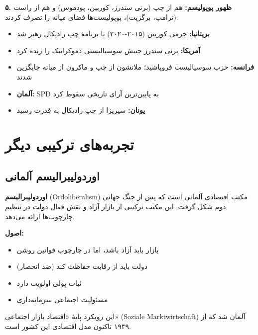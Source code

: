 \textbf{۵. ظهور پوپولیسم:}
هم از چپ (برنی سندرز، کوربین، پودموس) و هم از راست (ترامپ، برگزیت)، پوپولیست‌ها فضای میانه را تصرف کردند.


\begin{tcolorbox}[
    enhanced,
    colback=goldaccent!10,
    colframe=goldaccent,
    boxrule=1.5pt,
    arc=5pt,
    fonttitle=\bfseries,
    title={\rl{🟡 نکتهٔ تاریخی: واکنش‌ها به راه سوم}}
]
\begin{itemize}
    \item \textbf{بریتانیا:} جرمی کوربین (۲۰۱۵-۲۰۲۰) با برنامهٔ چپ رادیکال رهبر شد
    \item \textbf{آمریکا:} برنی سندرز جنبش سوسیالیستی دموکراتیک را زنده کرد
    \item \textbf{فرانسه:} حزب سوسیالیست فروپاشید؛ ملانشون از چپ و ماکرون از میانه جایگزین شدند
    \item \textbf{آلمان:} SPD به پایین‌ترین آرای تاریخی سقوط کرد
    \item \textbf{یونان:} سیریزا از چپ رادیکال به قدرت رسید
\end{itemize}
\end{tcolorbox}

\section{تجربه‌های ترکیبی دیگر}

\subsection{اوردولیبرالیسم آلمانی}

\begin{tcolorbox}[
    enhanced,
    colback=rightblue!8,
    colframe=rightblue,
    boxrule=1.5pt,
    arc=5pt,
    fonttitle=\bfseries,
    title={\rl{🔵 مفهوم کلیدی: اوردولیبرالیسم}}
]
\textbf{اوردولیبرالیسم} (Ordoliberalism) مکتب اقتصادی آلمانی است که پس از جنگ جهانی دوم شکل گرفت. این مکتب ترکیبی از بازار آزاد و نقش فعال دولت در تنظیم چارچوب‌ها ارائه می‌دهد.

\textbf{اصول:}
\begin{itemize}
    \item بازار باید آزاد باشد، اما در چارچوب قوانین روشن
    \item دولت باید از رقابت حفاظت کند (ضد انحصار)
    \item ثبات پولی اولویت دارد
    \item مسئولیت اجتماعی سرمایه‌داری
\end{itemize}

این رویکرد پایهٔ «اقتصاد بازار اجتماعی» (Soziale Marktwirtschaft) آلمان شد که از ۱۹۴۹ تاکنون مدل اقتصادی این کشور است.
\end{tcolorbox}


